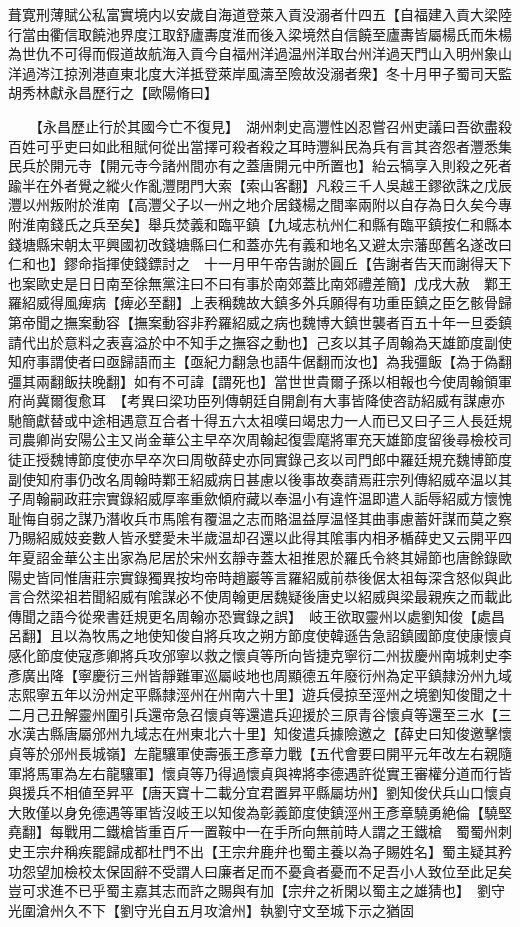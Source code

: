 葺寛刑薄賦公私富實境内以安歲自海道登萊入貢没溺者什四五【自福建入貢大梁陸行當由衢信取饒池界度江取舒廬夀度淮而後入梁境然自信饒至廬夀皆屬楊氏而朱楊為世仇不可得而假道故航海入貢今自福州洋過温州洋取台州洋過天門山入明州象山洋過涔江掠洌港直東北度大洋抵登萊岸風濤至險故没溺者衆】冬十月甲子蜀司天監胡秀林獻永昌歷行之【歐陽脩曰】

　　【永昌歷止行於其國今亡不復見】　湖州刺史高灃性凶忍嘗召州吏議曰吾欲盡殺百姓可乎吏曰如此租賦何從出當擇可殺者殺之耳時灃糾民為兵有言其咨怨者灃悉集民兵於開元寺【開元寺今諸州間亦有之蓋唐開元中所置也】紿云犒享入則殺之死者踰半在外者覺之縱火作亂灃閉門大索【索山客翻】凡殺三千人吳越王鏐欲誅之戊辰灃以州叛附於淮南【高灃父子以一州之地介居錢楊之間率兩附以自存為日久矣今專附淮南錢氏之兵至矣】舉兵焚義和臨平鎮【九域志杭州仁和縣有臨平鎮按仁和縣本錢塘縣宋朝太平興國初改錢塘縣曰仁和蓋亦先有義和地名又避太宗藩邸舊名遂改曰仁和也】鏐命指揮使錢鏢討之　十一月甲午帝告謝於圓丘【告謝者告天而謝得天下也案歐史是日日南至徐無黨注曰不曰有事於南郊蓋比南郊禮差簡】戊戌大赦　鄴王羅紹威得風痺病【痺必至翻】上表稱魏故大鎮多外兵願得有功重臣鎮之臣乞骸骨歸第帝聞之撫案動容【撫案動容非矜羅紹威之病也魏博大鎮世襲者百五十年一旦委鎮請代出於意料之表喜溢於中不知手之撫容之動也】己亥以其子周翰為天雄節度副使知府事謂使者曰亟歸語而主【亟紀力翻急也語牛倨翻而汝也】為我彊飯【為于偽翻彊其兩翻飯扶晚翻】如有不可諱【謂死也】當世世貴爾子孫以相報也今使周翰領軍府尚冀爾復愈耳　【考異曰梁功臣列傳朝廷自開創有大事皆降使咨訪紹威有謀慮亦馳簡獻替或中途相遇意互合者十得五六太祖嘆曰竭忠力一人而已又曰子三人長廷規司農卿尚安陽公主又尚金華公主早卒次周翰起復雲麾將軍充天雄節度留後尋檢校司徒正授魏博節度使亦早卒次曰周敬薛史亦同實錄己亥以司門郎中羅廷規充魏博節度副使知府事仍改名周翰時鄴王紹威病日甚慮以後事故奏請焉莊宗列傳紹威卒温以其子周翰嗣政莊宗實錄紹威厚率重歛傾府藏以奉温小有違忤温即遣人詬辱紹威方懷愧耻悔自弱之謀乃潛收兵市馬隂有覆温之志而賂温益厚温怪其曲事慮蓄奸謀而莫之察乃賜紹威妓妾數人皆氶嬖愛未半歲温却召還以此得其隂事内相矛楯薛史又云開平四年夏詔金華公主出家為尼居於宋州玄靜寺蓋太祖推恩於羅氏令終其婦節也唐餘錄歐陽史皆同惟唐莊宗實錄獨異按均帝時趙巖等言羅紹威前恭後倨太祖每深含怒似與此言合然梁祖若聞紹威有隂謀必不使周翰更居魏疑後唐史以紹威與梁最親疾之而載此傳聞之語今從衆書廷規更名周翰亦恐實錄之誤】　岐王欲取靈州以處劉知俊【處昌呂翻】且以為牧馬之地使知俊自將兵攻之朔方節度使韓遜告急詔鎮國節度使康懷貞感化節度使寇彥卿將兵攻邠寧以救之懷貞等所向皆捷克寧衍二州拔慶州南城刺史李彥廣出降【寧慶衍三州皆靜難軍巡屬岐地也周顯德五年廢衍州為定平鎮隸汾州九域志熙寧五年以汾州定平縣隸涇州在州南六十里】遊兵侵掠至涇州之境劉知俊聞之十二月己丑解靈州圍引兵還帝急召懷貞等還遣兵迎援於三原青谷懷貞等還至三水【三水漢古縣唐屬邠州九域志在州東北六十里】知俊遣兵據險邀之【薛史曰知俊邀擊懷貞等於邠州長城嶺】左龍驤軍使壽張王彥章力戰【五代會要曰開平元年改左右親隨軍將馬軍為左右龍驤軍】懷貞等乃得過懷貞與禆將李德遇許從實王審權分道而行皆與援兵不相値至昇平【唐天寶十二載分宜君置昇平縣屬坊州】劉知俊伏兵山口懷貞大敗僅以身免德遇等軍皆沒岐王以知俊為彰義節度使鎮涇州王彥章驍勇絶倫【驍堅堯翻】每戰用二鐵槍皆重百斤一置鞍中一在手所向無前時人謂之王鐵槍　蜀蜀州刺史王宗弁稱疾罷歸成都杜門不出【王宗弁鹿弁也蜀主養以為子賜姓名】蜀主疑其矜功怨望加檢校太保固辭不受謂人曰廉者足而不憂貪者憂而不足吾小人致位至此足矣豈可求進不已乎蜀主嘉其志而許之賜與有加【宗弁之祈閑以蜀主之雄猜也】　劉守光圍滄州久不下【劉守光自五月攻滄州】執劉守文至城下示之猶固